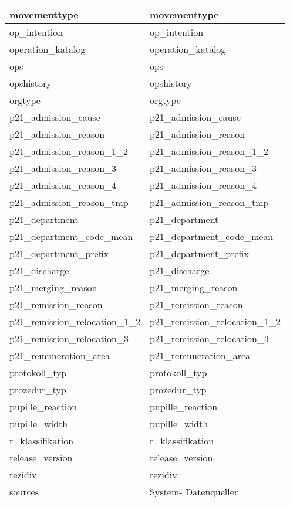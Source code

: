 \begin{longtable}{||p{6cm}|p{7.8cm}||}
  	movementtype & movementtype\\ \hline
  	op\_intention & op\_intention\\ \hline
  	operation\_katalog & operation\_katalog\\ \hline
  	ops & ops\\ \hline
  	opshistory & opshistory\\ \hline
  	orgtype & orgtype\\ \hline
  	p21\_admission\_cause & p21\_admission\_cause\\ \hline
  	p21\_admission\_reason & p21\_admission\_reason\\ \hline
  	p21\_admission\_reason\_1\_2 & p21\_admission\_reason\_1\_2\\ \hline
  	p21\_admission\_reason\_3 & p21\_admission\_reason\_3\\ \hline
  	p21\_admission\_reason\_4 & p21\_admission\_reason\_4\\ \hline
  	p21\_admission\_reason\_tmp & p21\_admission\_reason\_tmp\\ \hline
  	p21\_department & p21\_department\\ \hline
  	p21\_department\_code\_mean & p21\_department\_code\_mean\\ \hline
  	p21\_department\_prefix & p21\_department\_prefix\\ \hline
  	p21\_discharge & p21\_discharge\\ \hline
  	p21\_merging\_reason & p21\_merging\_reason\\ \hline
  	p21\_remission\_reason & p21\_remission\_reason\\ \hline
  	p21\_remission\_relocation\_1\_2 & p21\_remission\_relocation\_1\_2\\ \hline
  	p21\_remission\_relocation\_3 & p21\_remission\_relocation\_3\\ \hline
  	p21\_remuneration\_area & p21\_remuneration\_area\\ \hline
  	protokoll\_typ & protokoll\_typ\\ \hline
  	prozedur\_typ & prozedur\_typ\\ \hline
  	pupille\_reaction & pupille\_reaction\\ \hline
  	pupille\_width & pupille\_width\\ \hline
  	r\_klassifikation & r\_klassifikation\\ \hline
  	release\_version & release\_version\\ \hline
  	rezidiv & rezidiv\\ \hline
  	sources & System- Datenquellen\\ \hline

\end{longtable}
